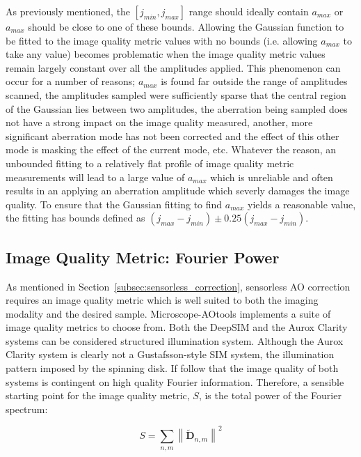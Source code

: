 As previously mentioned, the $[j_{min},j_{max}]$ range should ideally contain $a_{max}$ or $a_{max}$ should be close to one of these bounds. Allowing the Gaussian function to be fitted to the image quality metric values with no bounds (i.e. allowing $a_{max}$ to take any value) becomes problematic when the image quality metric values remain largely constant over all the amplitudes applied. This phenomenon can occur for a number of reasons; $a_{max}$ is found far outside the range of amplitudes scanned, the amplitudes sampled were sufficiently sparse that the central region of the Gaussian lies between two amplitudes, the aberration being sampled does not have a strong impact on the image quality measured, another, more significant aberration mode has not been corrected and the effect of this other mode is masking the effect of the current mode, etc. Whatever the reason, an unbounded fitting to a relatively flat profile of image quality metric measurements will lead to a large value of $a_{max}$ which is unreliable and often results in an applying an aberration amplitude which severly damages the image quality. To ensure that the Gaussian fitting to find $a_{max}$ yields a reasonable value, the fitting has bounds defined as $(j_{max}-j_{min}) \pm 0.25(j_{max}-j_{min})$.

\subsection{Image Quality Metric: Fourier Power}
\label{subsec:fourier_power_metric}

As mentioned in Section~\ref{subsec:sensorless_correction}, 
sensorless AO correction requires an image quality metric which
is well suited to both the imaging modality and the desired 
sample. Microscope-AOtools implements a suite of image quality
metrics to choose from. Both the DeepSIM and the Aurox
Clarity systems can be considered structured illumination
system. Although the Aurox Clarity system is clearly not a 
Gustafsson-style SIM system, the illumination pattern imposed by
the spinning disk. If follow that the image quality of both systems is
contingent on high quality Fourier information. Therefore, 
a sensible starting point for the image quality metric, $S$, 
is the total power of the Fourier spectrum:

\begin{equation}\label{eq:fourier_power_spectrum}
S = \sum\limits_{n,m}{\left\| \tilde{\textbf{D}}_{n,m} \right\|^2}
\end{equation}

